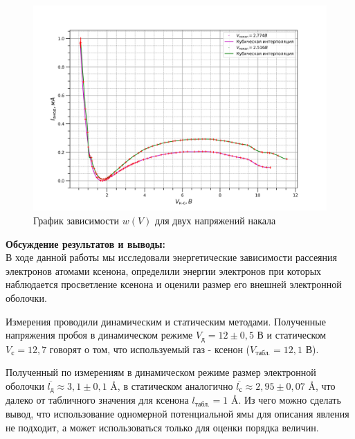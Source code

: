 \documentclass[a4paper, 12pt]{article}%
\begin{document}
\begin{enumerate}
	
	\begin{figure}[H]
		\centering
		\includegraphics[width=1\linewidth]{I(V)}
		\caption{График зависимости $w(V)$ для двух напряжений накала}
	\end{figure}
	
	\textbf{Обсуждение результатов и выводы: }\\
	
	В ходе данной работы мы исследовали энергетические зависимости рассеяния электронов атомами ксенона, определили энергии электронов при которых наблюдается просветление ксенона и оценили размер его внешней электронной оболочки.
	
	Измерения проводили динамическим и статическим методами. Полученные напряжения пробоя в динамическом режиме $ V_{\text{д}} = 12 \pm 0,5$ В и статическом $ V_{\text{с}} = 12,7 $ говорят о том, что используемый газ - ксенон ($ V_{\text{табл.}} = 12,1 $ В).
	
	Полученный по измерениям в динамическом режиме размер электронной оболочки $\overline{ l_{\text{д}}} \approx  3,1 \pm 0,1$ \AA, в статическом аналогично $\overline{ l_{\text{с}}} \approx  2,95 \pm 0,07$ \AA, что далеко от табличного значения для ксенона $l_{\text{табл.}} = 1$ \AA. Из чего можно сделать вывод, что использование одномерной потенциальной ямы для описания явления не подходит, а может использоваться только для оценки порядка величин.
	
	
	
	
	
	
	
	
	
	
	\end{enumerate}
	
	
\end{document}
